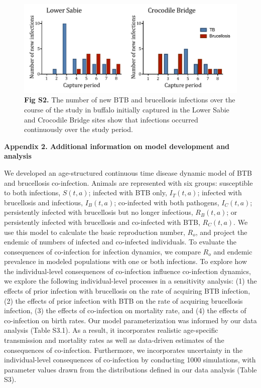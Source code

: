 \documentclass[10pt,letterpaper]{article}
\begin{document}
\begin{figure}
\centering
\includegraphics[width=.99\linewidth]{Figure_S2.pdf}
\caption*{\textbf{Fig S2.} The number of new BTB and brucellosis infections over the course of the study in buffalo initially captured in the Lower Sabie and Crocodile Bridge sites show that infections occurred continuously over the study period.}
\label{fig:figS2}
\end{figure}


\pagebreak
\clearpage

\noindent \Large \textbf{Appendix 2. Additional information on model development and analysis}\\

\normalsize

We developed an age-structured continuous time disease dynamic model of BTB and brucellosis co-infection. 
Animals are represented with six groups: susceptible to both infections, $S(t, a)$; infected with BTB only, $I_T (t, a)$; infected with brucellosis and infectious, $I_B (t, a)$; co-infected with both pathogens, $I_C (t, a)$; persistently infected with brucellosis but no longer infectious, $R_B (t,a)$; or persistently infected with brucellosis and co-infected with BTB, $R_C (t, a)$. 
We use this model to calculate the basic reproduction number, $R_o$, and project the endemic of numbers of infected and co-infected individuals.
To evaluate the consequences of co-infection for infection dynamics, we compare $R_o$ and endemic prevalence in modeled populations with one or both infections.
To explore how the individual-level consequences of co-infection influence co-infection dynamics, we explore the following individual-level processes in a sensitivity analysis: (1) the effects of prior infection with brucellosis on the rate of acquiring BTB infection, (2) the effects of prior infection with BTB on the rate of acquiring brucellosis infection, (3) the effects of co-infection on mortality rate, and (4) the effects of co-infection on birth rates.
Our model parameterization was informed by our data analysis (Table S3.1). 
As a result, it incorporates realistic age-specific transmission and mortality rates as well as data-driven estimates of the consequences of co-infection.
Furthermore, we incorporates uncertainty in the individual-level consequences of co-infection by conducting 1000 simulations, with parameter values drawn from the distributions defined in our data analysis (Table S3). \\
\end{document}
